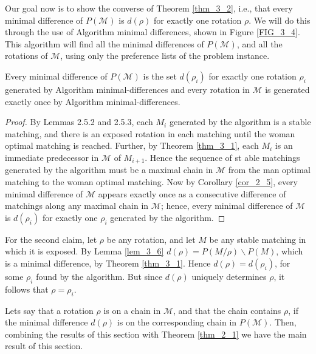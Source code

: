 Our goal now is to show the converse of Theorem \ref{thm_3_2}, i.e., that every minimal difference of $P(\mathcal{M})$ is $d(\rho)$ for exactly one rotation $\rho$. We will do this through the use of Algorithm minimal differences, shown in Figure \ref{FIG_3_4}. This algorithm will find all the minimal differences of $P(\mathcal{M})$, and all the rotations of $\mathcal{M}$, using only the preference lists of the problem instance.

\begin{theorem}\label{thm_3_3}
    Every minimal difference of $P(\mathcal{M})$ is the set $d(\rho_i)$ for exactly one rotation $\rho_i$ generated by Algorithm minimal-differences and every rotation in $\mathcal{M}$ is generated exactly once by Algorithm minimal-differences.
    
\end{theorem}



\begin{proof}
    By Lemmas 2.5.2 and 2.5.3, each $M_i$ generated by the algorithm is a stable matching, and there is an exposed rotation in each matching until the woman optimal matching is reached. Further, by Theorem \ref{thm_3_1}, each $M_i$ is an immediate predecessor in $\mathcal{M}$ of $M_{i+1}$. Hence the sequence of st able matchings generated by the algorithm must be a maximal chain in $\mathcal{M}$ from the man optimal matching to the woman optimal matching. Now by Corollary \ref{cor_2_5}, every minimal difference of $\mathcal{M}$ appears exactly once as a consecutive difference of matchings along any maximal chain in $\mathcal{M}$; hence, every minimal difference of $\mathcal{M}$ is $d\left(\rho_i\right)$ for exactly one $\rho_i$ generated by the algorithm.
\end{proof}

For the second claim, let $\rho$ be any rotation, and let $M$ be any stable matching in which it is exposed. By Lemma \ref{lem_3_6} $d(\rho)=P(M / \rho) \backslash P(M)$, which is a minimal difference, by Theorem \ref{thm_3_1}. Hence $d(\rho)=d\left(\rho_i\right)$, for some $\rho_i$ found by the algorithm. But since $d(\rho)$ uniquely determines $\rho$, it follows that $\rho=\rho_i$.

Lets say that a rotation $\rho$ is on a chain in $\mathcal{M}$, and that the chain contains $\rho$, if the minimal difference $d(\rho)$ is on the corresponding chain in $P(\mathcal{M})$. Then, combining the results of this section with Theorem \ref{thm_2_1} we have the main result of this section.

